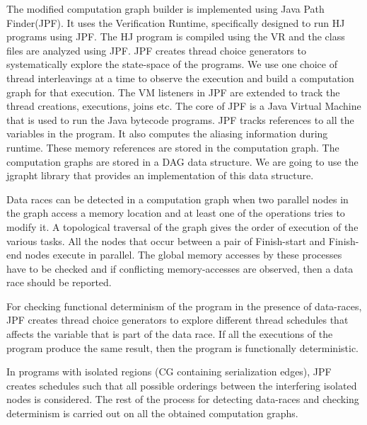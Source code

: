 The modified computation graph builder is implemented using Java Path Finder(JPF). It uses the Verification Runtime, specifically designed to run HJ programs using JPF. The HJ program is compiled using the VR and the class files are analyzed using JPF. JPF creates thread choice generators to systematically explore the state-space of the programs. We use one choice of thread interleavings at a time to observe the execution and build a computation graph for that execution. The VM listeners in JPF are extended to track the thread creations, executions, joins etc. The core of JPF is a Java Virtual Machine that is used to run the Java bytecode programs. JPF tracks references to all the variables in the program. It also computes the aliasing information during runtime. These memory references are stored in the computation graph. The computation graphs are stored in a DAG data structure. We are going to use the jgrapht library that provides an implementation of this data structure.

Data races can be detected in a computation graph when two parallel nodes in the graph access a memory location and at least one of the operations tries to modify it. A topological traversal of the graph gives the order of execution of the various tasks. All the nodes that occur between  a pair of Finish-start and Finish-end nodes execute in parallel. The global memory accesses by these processes have to be checked and if conflicting memory-accesses are observed, then a data race should be reported.

For checking functional determinism of the program in the presence of data-races, JPF creates thread choice generators to explore different thread schedules that affects the variable that is part of the data race. If all the executions of the program produce the same result, then the program is functionally deterministic.

In programs with isolated regions (CG containing serialization edges), JPF creates schedules such that all possible orderings between the interfering isolated nodes is considered. The rest of the process for detecting data-races and checking determinism is carried out on all the obtained computation graphs.
